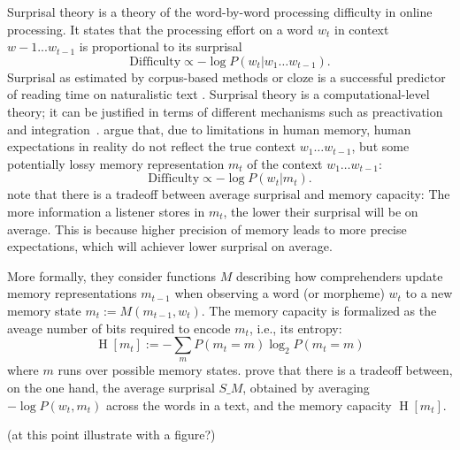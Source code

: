 \documentclass[11pt,letterpaper]{article}
\newcommand\mhahn[1]{{\color{red}(#1)}}
\begin{document}
Surprisal theory \citep{hale2001probabilistic, levy2008expectation} is a theory of the word-by-word processing difficulty in online processing.
It states that the processing effort on a word $w_t$ in context $w-1 ... w_{t-1}$ is proportional to its surprisal
     \begin{equation}   \label{eq:true-surp}
    \text{Difficulty} \propto -\log P(w_t | w_1\dots w_{t-1}).
\end{equation}
Surprisal as estimated by corpus-based methods or cloze is a successful predictor of reading time on naturalistic text \citep{smith2013effect,goodkind-predictive-2018,frank2019interaction,aurnhammer2019evaluating,wilcox2020predictive}. %
Surprisal theory is a computational-level theory; it can be justified in terms of different mechanisms such as preactivation and integration~\citep{kuperberg2016we}.
\citet{Hahn2020modeling} argue that, due to limitations in human memory, human expectations in reality do not reflect the true context $w_1\dots w_{t-1}$, but some potentially lossy memory representation $m_t$ of the context $w_1\dots w_{t-1}$:
\begin{equation}   \label{eq:lossy-surp}
    \text{Difficulty} \propto -\log P(w_t | m_t).
\end{equation}
\citet{Hahn2020modeling} note that there is a tradeoff between average surprisal and memory capacity:
The more information a listener stores in $m_t$, the lower their surprisal will be on average.
This is because higher precision of memory leads to more precise expectations, which will achiever lower surprisal on average.

More formally, they consider functions $M$ describing how comprehenders update memory representations $m_{t-1}$ when observing a word (or morpheme) $w_t$ to a new memory state $m_t := M(m_{t-1}, w_t)$.
The memory capacity is formalized as the aveage number of bits required to encode $m_t$, i.e., its entropy:
\begin{equation*}
    \operatorname{H}[m_t] := - \sum_m P(m_t = m) \log_2 P(m_t=m)
\end{equation*}
where $m$ runs over possible memory states.
\citet{Hahn2020modeling} prove that there is a tradeoff between, on the one hand, the average surprisal $S\_M$, obtained by averaging $- \log P(w_t , m_t)$ across the words in a text, and the memory capacity $\operatorname{H}[m_t]$.

\mhahn{at this point illustrate with a figure?}
\end{document}

